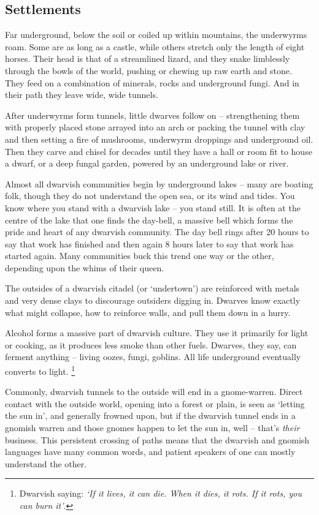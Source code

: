 \label{dwarvishHomes}
\renewcommand\npcsymbol{\Dw}

\subsection{Settlements}

Far underground, below the soil or coiled up within mountains, the underwyrms roam.
Some are as long as a castle, while others stretch only the length of eight horses.
Their head is that of a streamlined lizard, and they snake limblessly through the bowls of the world, pushing or chewing up raw earth and stone.
They feed on a combination of minerals, rocks and underground fungi.
And in their path they leave wide, wide tunnels.

After underwyrms form tunnels, little dwarves follow on -- strengthening them with properly placed stone arrayed into an arch or packing the tunnel with clay and then setting a fire of mushrooms, underwyrm droppings and underground oil. Then they carve and chisel for decades until they have a hall or room fit to house a dwarf, or a deep fungal garden, powered by an underground lake or river.

Almost all dwarvish communities begin by underground lakes -- many are boating folk, though they do not understand the open sea, or its wind and tides. You know where you stand with a dwarvish lake -- you stand still. It is often at the centre of the lake that one finds the day-bell, a massive bell which forms the pride and heart of any dwarvish community. The day bell rings after 20 hours to say that work has finished and then again 8 hours later to say that work has started again. Many communities buck this trend one way or the other, depending upon the whims of their queen.

The outsides of a dwarvish citadel (or `undertown') are reinforced with metals and very dense clays to discourage outsiders digging in.
Dwarves know exactly what might collapse, how to reinforce walls, and pull them down in a hurry.

Alcohol forms a massive part of dwarvish culture.
They use it primarily for light or cooking, as it produces less smoke than other fuels.
Dwarves, they say, can ferment anything -- living oozes, fungi, goblins.
All life underground eventually converts to light.%
\footnote{Dwarvish saying: \textit{`If it lives, it can die. When it dies, it rots. If it rots, you can burn it'}.}

Commonly, dwarvish tunnels to the outside will end in a gnome-warren.
Direct contact with the outside world, opening into a forest or plain, is seen as `letting the sun in',
and generally frowned upon, but if the dwarvish tunnel ends in a gnomish warren and those gnomes happen to let the sun in, well -- that's \emph{their} business.
This persistent crossing of paths means that the dwarvish and gnomish languages have many common words, and patient speakers of one can mostly understand the other.

